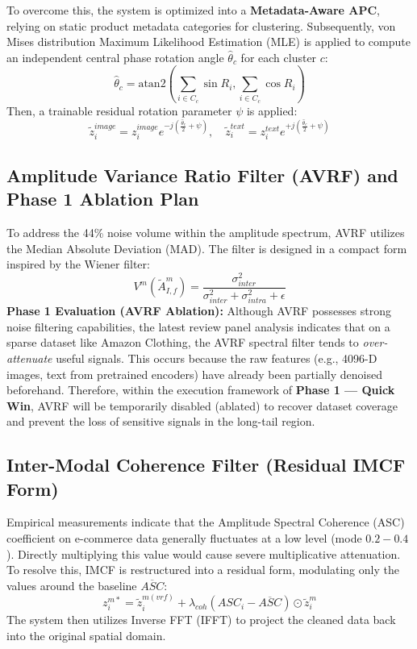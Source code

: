 \documentclass[12pt, a4paper]{article}
\begin{document}
To overcome this, the system is optimized into a \textbf{Metadata-Aware APC}, relying on static product metadata categories for clustering. Subsequently, von Mises distribution Maximum Likelihood Estimation (MLE) is applied to compute an independent central phase rotation angle $\hat{\theta}_c$ for each cluster $c$:
\begin{equation}
\hat{\theta}_c = \text{atan2}\left(\sum_{i \in C_c} \sin R_i, \sum_{i \in C_c} \cos R_i\right)
\end{equation}
Then, a trainable residual rotation parameter $\psi$ is applied:
\begin{equation}
\tilde{z}_i^{image} = z_i^{image}e^{-j(\frac{\hat{\theta}_c}{2} + \psi)}, \quad \tilde{z}_i^{text} = z_i^{text}e^{+j(\frac{\hat{\theta}_c}{2} + \psi)}
\end{equation}

\subsection{Amplitude Variance Ratio Filter (AVRF) and Phase 1 Ablation Plan}
To address the 44\% noise volume within the amplitude spectrum, AVRF utilizes the Median Absolute Deviation (MAD). The filter is designed in a compact form inspired by the Wiener filter:
\begin{equation}
V^m(\tilde{A}_{I,f}^m) = \frac{\sigma_{inter}^2}{\sigma_{inter}^2 + \sigma_{intra}^2 + \epsilon}
\end{equation}
\textbf{Phase 1 Evaluation (AVRF Ablation):} Although AVRF possesses strong noise filtering capabilities, the latest review panel analysis indicates that on a sparse dataset like Amazon Clothing, the AVRF spectral filter tends to \textit{over-attenuate} useful signals. This occurs because the raw features (e.g., 4096-D images, text from pretrained encoders) have already been partially denoised beforehand. Therefore, within the execution framework of \textbf{Phase 1 — Quick Win}, AVRF will be temporarily disabled (ablated) to recover dataset coverage and prevent the loss of sensitive signals in the long-tail region.

\subsection{Inter-Modal Coherence Filter (Residual IMCF Form)}
Empirical measurements indicate that the Amplitude Spectral Coherence (ASC) coefficient on e-commerce data generally fluctuates at a low level (mode $0.2-0.4$). Directly multiplying this value would cause severe multiplicative attenuation. To resolve this, IMCF is restructured into a residual form, modulating only the values around the baseline $\overline{ASC}$:
\begin{equation}
z_i^{m*} = \tilde{z}_i^{m(vrf)} + \lambda_{coh}(ASC_i - \overline{ASC}) \odot \tilde{z}_i^m
\end{equation}
The system then utilizes Inverse FFT (IFFT) to project the cleaned data back into the original spatial domain.
\end{document}
